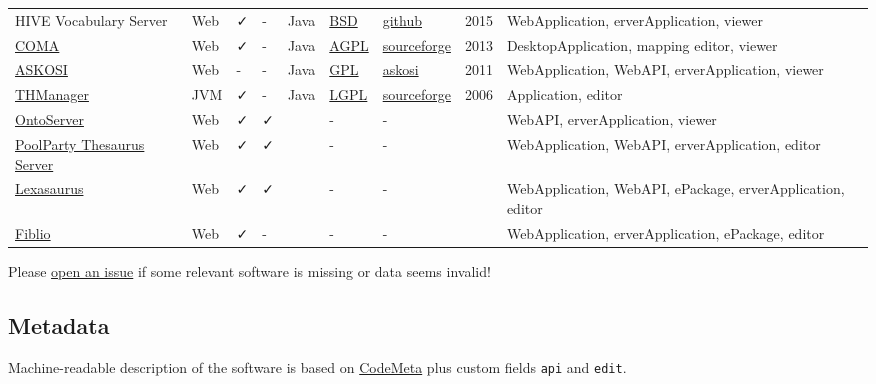 \documentclass[
  DIV=10]{article}
\begin{document}
\begin{longtable}[]{@{}lllllllll@{}}
HIVE Vocabulary Server & Web & ✓ & - & Java &
\href{https://spdx.org/licenses/BSD-3-Clause}{BSD} &
\href{https://github.com/MetadataResearchCenter/hive-mrc}{github} & 2015
& WebApplication, erverApplication, viewer \\
\href{https://sourceforge.net/projects/coma-ce/files/}{COMA} & Web & ✓ &
- & Java & \href{https://spdx.org/licenses/AGPL-3.0-or-later}{AGPL} &
\href{https://sourceforge.net/projects/coma-ce/}{sourceforge} & 2013 &
DesktopApplication, mapping editor, viewer \\
\href{http://www.askosi.org/}{ASKOSI} & Web & - & - & Java &
\href{https://spdx.org/licenses/GPL-3.0-or-later}{GPL} &
\href{http://www.askosi.org/example/}{askosi} & 2011 & WebApplication,
WebAPI, erverApplication, viewer \\
\href{https://thmanager.sourceforge.io/}{THManager} & JVM & ✓ & - & Java
& \href{https://spdx.org/licenses/LGPL-3.0-or-later}{LGPL} &
\href{https://sourceforge.net/projects/thmanager/}{sourceforge} & 2006 &
Application, editor \\
\href{https://ontoserver.csiro.au/}{OntoServer} & Web & ✓ & ✓ & & - & -
& & WebAPI, erverApplication, viewer \\
\href{https://www.poolparty.biz/poolparty-thesaurus-manager}{PoolParty
Thesaurus Server} & Web & ✓ & ✓ & & - & - & & WebApplication, WebAPI,
erverApplication, editor \\
\href{http://www.k-int.com/products/lexaurus/}{Lexasaurus} & Web & ✓ & ✓
& & - & - & & WebApplication, WebAPI, ePackage, erverApplication,
editor \\
\href{https://www.fiblio.de/}{Fiblio} & Web & ✓ & - & & - & - & &
WebApplication, erverApplication, ePackage, editor \\

\end{longtable}

Please
\href{https://github.com/gbv/bartoc-vocabulary-software/issues}{open an
issue} if some relevant software is missing or data seems invalid!

\newpage
{}
\recalctypearea

\subsection{Metadata}\label{metadata}

Machine-readable description of the software is based on
\href{https://codemeta.github.io/}{CodeMeta} plus custom fields
\texttt{api} and \texttt{edit}.
\end{document}
